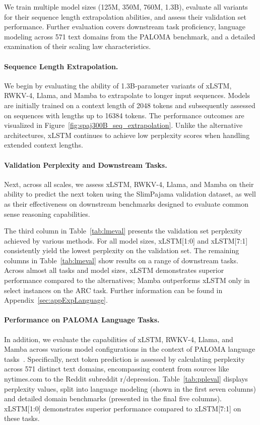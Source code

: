 We train multiple model sizes (125M, 350M, 760M, 1.3B), evaluate all variants for their sequence length extrapolation abilities, and assess their validation set performance. Further evaluation covers downstream task proficiency, language modeling across 571 text domains from the PALOMA benchmark, and a detailed examination of their scaling law characteristics.

\paragraph{Sequence Length Extrapolation.}
\label{sec:spaj300B_ctx_extrapolation}
We begin by evaluating the ability of 1.3B-parameter variants of xLSTM, RWKV-4, Llama, and Mamba to extrapolate to longer input sequences. Models are initially trained on a context length of 2048 tokens and subsequently assessed on sequences with lengths up to 16384 tokens. The performance outcomes are visualized in Figure~\ref{fig:spaj300B_seq_extrapolation}. Unlike the alternative architectures, xLSTM continues to achieve low perplexity scores when handling extended context lengths.

\paragraph{Validation Perplexity and Downstream Tasks.}
\label{sec:spaj_downstream_eval}
Next, across all scales, we assess xLSTM, RWKV-4, Llama, and Mamba on their ability to predict the next token using the SlimPajama validation dataset, as well as their effectiveness on downstream benchmarks designed to evaluate common sense reasoning capabilities.

The third column in Table~\ref{tab:lmeval} presents the validation set perplexity achieved by various methods. For all model sizes, xLSTM[1:0] and xLSTM[7:1] consistently yield the lowest perplexity on the validation set. The remaining columns in Table~\ref{tab:lmeval} show results on a range of downstream tasks. Across almost all tasks and model sizes, xLSTM demonstrates superior performance compared to the alternatives; Mamba outperforms xLSTM only in select instances on the ARC task. Further information can be found in Appendix~\ref{sec:appExpLanguage}.

\paragraph{Performance on PALOMA Language Tasks.} In addition, we evaluate the capabilities of xLSTM, RWKV-4, Llama, and Mamba across various model configurations in the context of PALOMA language tasks~\citep{Magnusson:23arxivshort}. Specifically, next token prediction is assessed by calculating perplexity across 571 distinct text domains, encompassing content from sources like nytimes.com to the Reddit subreddit r/depression. 
Table~\ref{tab:ppleval} displays perplexity values, split into language modeling (shown in the first seven columns) and detailed domain benchmarks (presented in the final five columns). xLSTM[1:0] demonstrates superior performance compared to xLSTM[7:1] on these tasks.

